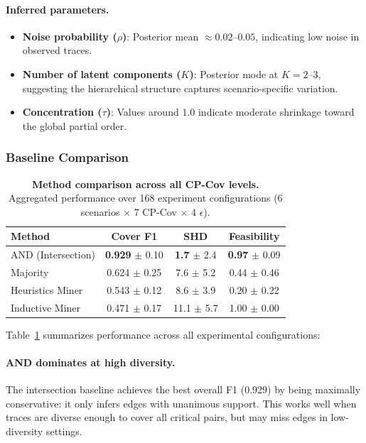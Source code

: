 \paragraph{Inferred parameters.}
\begin{itemize}[nosep,leftmargin=*]
    \item \textbf{Noise probability ($\rho$)}: Posterior mean $\approx 0.02$--$0.05$, indicating low noise in observed traces.
    \item \textbf{Number of latent components ($K$)}: Posterior mode at $K=2$--$3$, suggesting the hierarchical structure captures scenario-specific variation.
    \item \textbf{Concentration ($\tau$)}: Values around $1.0$ indicate moderate shrinkage toward the global partial order.
\end{itemize}

\subsubsection{Baseline Comparison}
\label{sec:baseline_comparison}

\begin{table}[t]
\centering
\caption{\textbf{Method comparison across all CP-Cov levels.} Aggregated performance over 168 experiment configurations (6 scenarios $\times$ 7 CP-Cov $\times$ 4 $\epsilon$).}
\label{tab:method_comparison}
\small
\begin{tabular}{lccc}
\toprule
\textbf{Method} & \textbf{Cover F1} & \textbf{SHD} & \textbf{Feasibility} \\
\midrule
AND (Intersection) & \textbf{0.929} $\pm$ 0.10 & \textbf{1.7} $\pm$ 2.4 & \textbf{0.97} $\pm$ 0.09 \\
Majority & 0.624 $\pm$ 0.25 & 7.6 $\pm$ 5.2 & 0.44 $\pm$ 0.46 \\
Heuristics Miner & 0.543 $\pm$ 0.12 & 8.6 $\pm$ 3.9 & 0.20 $\pm$ 0.22 \\
Inductive Miner & 0.471 $\pm$ 0.17 & 11.1 $\pm$ 5.7 & 1.00 $\pm$ 0.00 \\
\bottomrule
\end{tabular}
\end{table}

Table~\ref{tab:method_comparison} summarizes performance across all experimental configurations:

\paragraph{AND dominates at high diversity.} The intersection baseline achieves the best overall F1 (0.929) by being maximally conservative: it only infers edges with unanimous support. This works well when traces are diverse enough to cover all critical pairs, but may miss edges in low-diversity settings.


